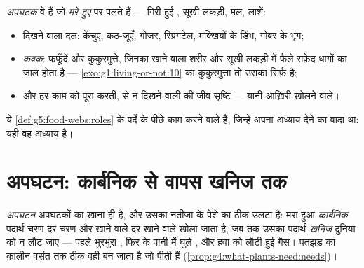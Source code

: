 \begin{definition}[अपघटक]\label{def:g6:decomposers-and-soil:decomposers}
\emph{अपघटक} वे  हैं जो \emph{मरे हुए } पर पलते हैं --- गिरी हुई , सूखी लकड़ी, मल, लाशें:
\begin{itemize}
  \item दिखने वाला दल: केंचुए, कठ-जूएँ, गोजर, स्प्रिंगटेल, मक्खियों के
        डिंभ, गोबर के भृंग;
  \item \emph{कवक}: फफूँदें और कुकुरमुत्ते, जिनका खाने वाला
        शरीर  और सूखी लकड़ी में फैले सफ़ेद धागों का जाल होता है
        --- \cref{exo:g1:living-or-not:10} का कुकुरमुत्ता तो उसका
        सिर्फ़  है;
  \item और हर काम को पूरा करती,  से न दिखने वाली  की
        जीव-सृष्टि --- यानी आख़िरी खोलने वाले।
\end{itemize}
ये \cref{def:g5:food-webs:roles} के पर्दे के पीछे काम करने वाले हैं,
जिन्हें अपना अध्याय देने का वादा था: यही वह अध्याय है।
\end{definition}

\section{अपघटन: कार्बनिक से वापस खनिज तक}

\begin{proposition}\label{prop:g6:decomposers-and-soil:decomposition}
\emph{अपघटन} अपघटकों का खाना ही है, और उसका नतीजा
 के पेशे का ठीक उलटा है: मरा हुआ \emph{कार्बनिक} पदार्थ चरण
दर चरण और खाने वाले दर खाने वाले खोला जाता है, जब तक उसका पदार्थ
\emph{खनिज} दुनिया को न लौट जाए --- पहले भुरभुरा , फिर  के
पानी में घुले , और हवा को लौटी हुई गैस। पतझड़ का क़ालीन वसंत तक
ठीक वही बन जाता है जो  पीती हैं
(\cref{prop:g4:what-plants-need:needs})।
\end{proposition}
\admitted

